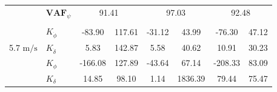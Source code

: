 \begin{table}[]
\begin{tabular}{llcccccc}
                                                   & $\mathbf{VAF}_\psi$                                                & \multicolumn{2}{c}{91.41}                                                                         & \multicolumn{2}{c}{97.03}                                                                         & \multicolumn{2}{c}{92.48}                                                                         \\
                                                   &                                                                    & \multicolumn{1}{l}{}                        & \multicolumn{1}{l}{}                                & \multicolumn{1}{l}{}                        & \multicolumn{1}{l}{}                                & \multicolumn{1}{l}{}                        & \multicolumn{1}{l}{}                                \\ \hline
                                                   & $K_{\dot{\phi}} $                                                  & -83.90                                      & 117.61                                              & -31.12                                      & 43.99                                               & -76.30                                      & 47.12                                               \\
    \multirow{-2}{*}{5.7 $\si{\meter\per\second}$} & $K_{\dot{\delta}}$                                                 & 5.83                                        & 142.87                                              & 5.58                                        & 40.62                                               & 10.91                                       & 30.23                                               \\
                                                   & $K_{\phi} $                                                        & -166.08                                     & 127.89                                              & -43.64                                      & 67.14                                               & -208.33                                     & 83.09                                               \\
                                                   & $K_\delta $                                                        & 14.85                                       & 98.10                                               & 1.14                                        & 1836.39                                             & 79.44                                       & 75.47                                               \\

\end{tabular}
\end{table}
